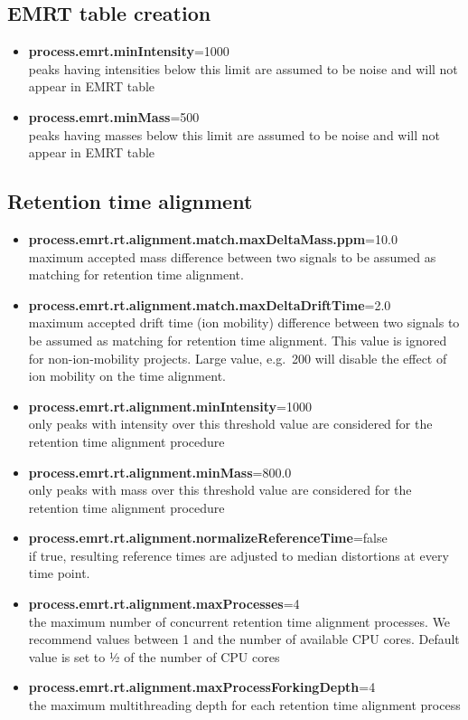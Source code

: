 \documentclass[]{article}
\providecommand{\tightlist}{%
  \setlength{\itemsep}{0pt}\setlength{\parskip}{0pt}}
\begin{document}
\subsection{EMRT table creation}\label{emrt-table-creation}

\begin{itemize}
\tightlist
\item
  \textbf{process.emrt.minIntensity}=1000\\
  peaks having intensities below this limit are assumed to be noise and
  will not appear in EMRT table
\item
  \textbf{process.emrt.minMass}=500\\
  peaks having masses below this limit are assumed to be noise and will
  not appear in EMRT table
\end{itemize}

\subsection{Retention time alignment}\label{retention-time-alignment}

\begin{itemize}
\tightlist
\item
  \textbf{process.emrt.rt.alignment.match.maxDeltaMass.ppm}=10.0\\
  maximum accepted mass difference between two signals to be assumed as
  matching for retention time alignment.
\item
  \textbf{process.emrt.rt.alignment.match.maxDeltaDriftTime}=2.0\\
  maximum accepted drift time (ion mobility) difference between two
  signals to be assumed as matching for retention time alignment. This
  value is ignored for non-ion-mobility projects. Large value, e.g.~200
  will disable the effect of ion mobility on the time alignment.
\item
  \textbf{process.emrt.rt.alignment.minIntensity}=1000\\
  only peaks with intensity over this threshold value are considered for
  the retention time alignment procedure
\item
  \textbf{process.emrt.rt.alignment.minMass}=800.0\\
  only peaks with mass over this threshold value are considered for the
  retention time alignment procedure
\item
  \textbf{process.emrt.rt.alignment.normalizeReferenceTime}=false\\
  if true, resulting reference times are adjusted to median distortions
  at every time point.
\item
  \textbf{process.emrt.rt.alignment.maxProcesses}=4\\
  the maximum number of concurrent retention time alignment processes.
  We recommend values between 1 and the number of available CPU cores.
  Default value is set to ½ of the number of CPU cores
\item
  \textbf{process.emrt.rt.alignment.maxProcessForkingDepth}=4\\
  the maximum multithreading depth for each retention time alignment
  process
\end{itemize}
\end{document}
